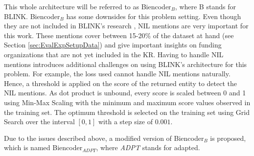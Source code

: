\documentclass{report}
\theoremstyle{definition}
\theoremstyle{remark}
\begin{document}
This whole architecture will be referred to as Biencoder$_{B}$, where B stands for BLINK. Biencoder$_{B}$ has some downsides for this problem setting. Even though they are not included in BLINK's research \cite{scalablezeroshot}, NIL mentions are very important for this work. These mentions cover between 15-20\% of the dataset at hand (see Section \ref{sec:EvalExpSetupData}) and give important insights on funding organizations that are not yet included in the KR. Having to handle NIL mentions introduces additional challenges on using BLINK's architecture for this problem. For example, the loss used cannot handle NIL mentions naturally. Hence, a threshold is applied on the score of the returned entity to detect the NIL mentions. As dot product is unbound, every score is scaled between 0 and 1 using Min-Max Scaling with the minimum and maximum score values observed in the training set. The optimum threshold is selected on the training set using Grid Search over the interval $[0,1]$ with a step size of $0.001$.


Due to the issues described above, a modified version of Biencoder$_{B}$ is proposed, which is named Biencoder$_{ADPT}$, where \textit{ADPT} stands for adapted.
\end{document}
